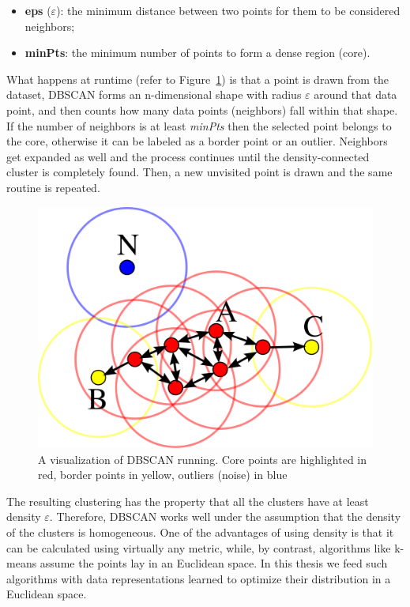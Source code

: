 \begin{itemize}
  \item \textbf{eps} ($\varepsilon$): the minimum distance between two points for them to be considered neighbors;
  \item \textbf{minPts}: the minimum number of points to form a dense region (core).
\end{itemize}
What happens at runtime (refer to Figure~\ref{fig:dbscan}) is that a point is drawn from the dataset, DBSCAN forms an n-dimensional shape with radius $\varepsilon$ around that data point, and then counts how many data points (neighbors) fall within that shape. If the number of neighbors is at least \textit{minPts} then the selected point belongs to the core, otherwise it can be labeled as a border point or an outlier. Neighbors get expanded as well and the process continues until the density-connected cluster is completely found. Then, a new unvisited point is drawn and the same routine is repeated.
\bigbreak
\begin{figure}[t!]
    \centering
    \captionsetup{justification=centering}
    \includegraphics[width=\textwidth]{./pictures/dbscan}
    \caption{A visualization of DBSCAN running. Core points are highlighted in red, border points in yellow, outliers (noise) in blue}
    \label{fig:dbscan}
\end{figure}
\noindent The resulting clustering has the property that all the clusters have at least density $\varepsilon$. Therefore, DBSCAN works well under the assumption that the density of the clusters is homogeneous. One of the advantages of using density is that it can be calculated using virtually any metric, while, by contrast, algorithms like k-means assume the points lay in an Euclidean space. In this thesis we feed such algorithms with data representations learned to optimize their distribution in a Euclidean space.

